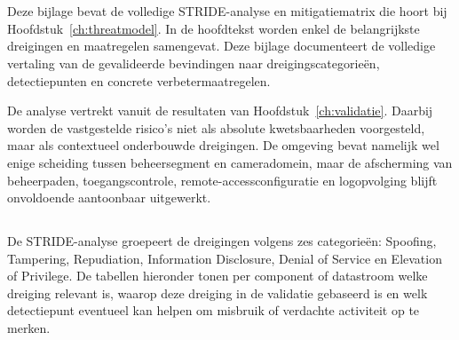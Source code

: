 
\chapter{}%
\label{app:stride-mitigaties}

Deze bijlage bevat de volledige STRIDE-analyse en mitigatiematrix die hoort bij Hoofdstuk~\ref{ch:threatmodel}. In de hoofdtekst worden enkel de belangrijkste dreigingen en maatregelen samengevat. Deze bijlage documenteert de volledige vertaling van de gevalideerde bevindingen naar dreigingscategorieën, detectiepunten en concrete verbetermaatregelen.

De analyse vertrekt vanuit de resultaten van Hoofdstuk~\ref{ch:validatie}. Daarbij worden de vastgestelde risico's niet als absolute kwetsbaarheden voorgesteld, maar als contextueel onderbouwde dreigingen. De omgeving bevat namelijk wel enige scheiding tussen beheersegment en cameradomein, maar de afscherming van beheerpaden, toegangscontrole, remote-accessconfiguratie en logopvolging blijft onvoldoende aantoonbaar uitgewerkt.

\section{}%
\label{app:volledige-stride-analyse}

De STRIDE-analyse groepeert de dreigingen volgens zes categorieën: Spoofing, Tampering, Repudiation, Information Disclosure, Denial of Service en Elevation of Privilege. De tabellen hieronder tonen per component of datastroom welke dreiging relevant is, waarop deze dreiging in de validatie gebaseerd is en welk detectiepunt eventueel kan helpen om misbruik of verdachte activiteit op te merken.

\subsection{}%
\label{app:stride-identiteit}

